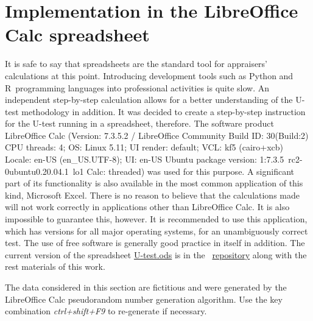 \documentclass[]{scrreprt}
\begin{document}
\section{Implementation in the LibreOffice Calc spreadsheet}\label{U-test-spreadsheet}
It is safe to say that spreadsheets are the standard tool for appraisers' calculations at this point. Introducing development tools such as Python and R~programming languages into professional activities is quite slow. An independent step-by-step calculation allows for a better understanding of the U-test methodology in addition. It was decided to create a step-by-step instruction for the U-test running in a spreadsheet, therefore. The software product LibreOffice Calc (Version: 7.3.5.2 / LibreOffice Community
Build ID: 30(Build:2) CPU threads: 4; OS: Linux 5.11; UI render: default; VCL: kf5 (cairo+xcb)
Locale: en-US (en\_US.UTF-8); UI: en-US Ubuntu package version: 1:7.3.5~rc2-0ubuntu0.20.04.1~lo1
Calc: threaded) was used for this purpose. A significant part of its functionality is also available in the most common application of this kind, Microsoft Excel. There is no reason to believe that the calculations made will not work correctly in applications other than LibreOffice Calc. It is also impossible to guarantee this, however. It is recommended to use this application, which has versions for all major operating systems, for an unambiguously correct test. The use of free software is generally good practice in itself in addition. The current version of the spreadsheet \href{https://github.com/Kirill-Murashev/AI_for_valuers_book/blob/main/Parts-Chapters/Mann-Whitney-Wilcoxon/U-test.ods}{U-test.ods} is in the ~\href{https://github.com/Kirill-Murashev/AI_for_valuers_book/tree/main/Parts&Chapters/Mann-Whitney-Wilcoxon}{repository} along with the rest materials of this work.

The data considered in this section are fictitious and were generated by the LibreOffice Calc pseudorandom number generation algorithm. Use the key combination \emph{ctrl+shift+F9} to re-generate if necessary.
\end{document}
